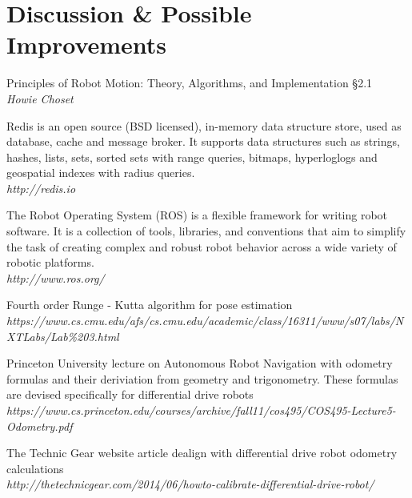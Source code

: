 \documentclass[11pt, a4paper]{article}
\begin{document}
\section{Discussion \& Possible Improvements}
\label{Discussion}



\newpage
\begin{thebibliography}{8}

\par{Principles of Robot Motion: Theory, Algorithms, and Implementation \S2.1}\\
\textit{Howie Choset}

\par{Redis is an open source (BSD licensed), in-memory data structure store, used as database, cache and message broker. It supports data structures such as strings, hashes, lists, sets, sorted sets with range queries, bitmaps, hyperloglogs and geospatial indexes with radius queries.}\\
\textit{http://redis.io}

\par{The Robot Operating System (ROS) is a flexible framework for writing robot software. It is a collection of tools, libraries, and conventions that aim to simplify the task of creating complex and robust robot behavior across a wide variety of robotic platforms.}\\
\textit{http://www.ros.org/}

\par{Fourth order Runge - Kutta algorithm for pose estimation} \\
\textit{https://www.cs.cmu.edu/afs/cs.cmu.edu/academic/class/16311/www/s07/labs/NXTLabs/Lab\%203.html }

\par{Princeton University lecture on Autonomous Robot Navigation with odometry formulas and their deriviation from geometry and trigonometry. These formulas are devised specifically for differential drive robots} \\
\textit{https://www.cs.princeton.edu/courses/archive/fall11/cos495/COS495-Lecture5-Odometry.pdf }

\par{The Technic Gear website article dealign with differential drive robot odometry calculations} \\
\textit{http://thetechnicgear.com/2014/06/howto-calibrate-differential-drive-robot/}


\end{thebibliography}
\end{document}
